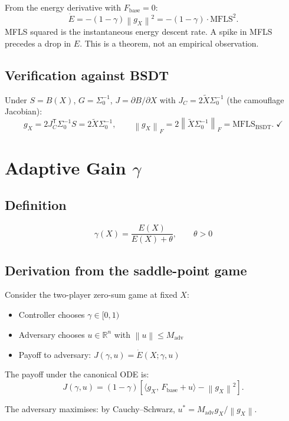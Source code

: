 \documentclass[11pt,a4paper]{article}
\theoremstyle{definition}
\newcommand{\R}{\mathbb{R}}
\newcommand{\T}{^{\mathsf{T}}}
\newcommand{\norm}[1]{\left\|#1\right\|}
\newcommand{\inner}[2]{\langle #1,\,#2\rangle}
\newcommand{\Fbase}{F_{\mathrm{base}}}
\newcommand{\gX}{g_X}
\newcommand{\mfls}{\mathrm{MFLS}}
\newcommand{\bsdt}{\mathrm{BSDT}}
\newcommand{\adv}{\mathrm{adv}}
\begin{document}
From the energy derivative with $\Fbase = 0$:
\[
\dot E = -(1-\gamma)\norm{\gX}^2 = -(1-\gamma)\cdot\mfls^2.
\]
MFLS squared is the instantaneous energy descent rate.
A spike in MFLS precedes a drop in $E$. This is a theorem, not an empirical observation.

\subsection{Verification against BSDT}

Under $S = B(X)$, $G = \Sigma_0^{-1}$, $J = \partial B/\partial X$ with
$J_C = 2\tilde X\Sigma_0^{-1}$ (the camouflage Jacobian):
\[
\gX = 2J_C\T \Sigma_0^{-1} S = 2\tilde X\Sigma_0^{-1},
\qquad
\norm{\gX}_F = 2\norm{\tilde X\Sigma_0^{-1}}_F = \mfls_\bsdt. \;\checkmark
\]

\section{Adaptive Gain $\gamma$}

\subsection{Definition}

\begin{lockedbox}
\[
\gamma(X) = \frac{E(X)}{E(X) + \theta}, \qquad \theta > 0
\]
\end{lockedbox}

\subsection{Derivation from the saddle-point game}

Consider the two-player zero-sum game at fixed $X$:
\begin{itemize}
\item Controller chooses $\gamma \in [0,1)$
\item Adversary chooses $u \in \R^n$ with $\norm{u} \leq M_\adv$
\item Payoff to adversary: $J(\gamma,u) = \dot E(X;\gamma,u)$
\end{itemize}

The payoff under the canonical ODE is:
\[
J(\gamma,u) = (1-\gamma)\left[\inner{\gX}{\Fbase + u} - \norm{\gX}^2\right].
\]

The adversary maximises: by Cauchy--Schwarz, $u^* = M_\adv \gX/\norm{\gX}$.
\end{document}
